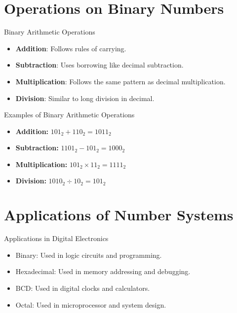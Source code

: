 \documentclass{beamer}
\begin{document}
\section{Operations on Binary Numbers}
\begin{frame}{Binary Arithmetic Operations}
    \begin{itemize}
        \item \textbf{Addition}: Follows rules of carrying.
        \item \textbf{Subtraction}: Uses borrowing like decimal subtraction.
        \item \textbf{Multiplication}: Follows the same pattern as decimal multiplication.
        \item \textbf{Division}: Similar to long division in decimal.
    \end{itemize}
\end{frame}

\begin{frame}{Examples of Binary Arithmetic Operations}
    \begin{itemize}
        \item \textbf{Addition:} $101_2 + 110_2 = 1011_2$
        \item \textbf{Subtraction:} $1101_2 - 101_2 = 1000_2$
        \item \textbf{Multiplication:} $101_2 \times 11_2 = 1111_2$
        \item \textbf{Division:} $1010_2 \div 10_2 = 101_2$
    \end{itemize}
\end{frame}

\section{Applications of Number Systems}
\begin{frame}{Applications in Digital Electronics}
    \begin{itemize}
        \item Binary: Used in logic circuits and programming.
        \item Hexadecimal: Used in memory addressing and debugging.
        \item BCD: Used in digital clocks and calculators.
        \item Octal: Used in microprocessor and system design.
    \end{itemize}
\end{frame}
\end{document}
